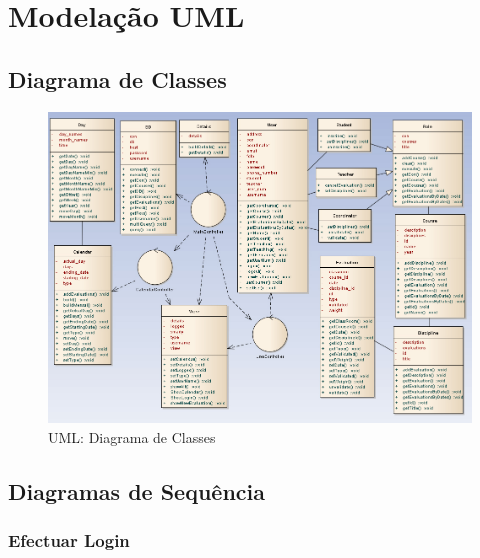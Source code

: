 \chapter{Modelação UML}

\section{Diagrama de Classes}
\begin{figure}[!htbp]
\centering
\includegraphics[width=17cm]{imagens/diagrama_de_classes.jpg}
\caption{UML: Diagrama de Classes}
\label{fig:diagrama_de_classes}
\end{figure}

\section{Diagramas de Sequência}

\subsection{Efectuar Login}

